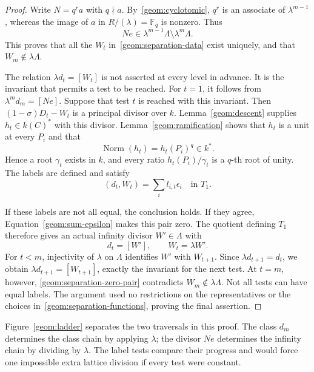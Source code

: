 \begin{proof}
Write $N=q^r a$ with $q\nmid a$.  By~\eqref{geom:cyclotomic},
$q^r$ is an associate of $\lambda^{m-1}$, whereas the image of $a$ in
$R/(\lambda)=\mathbb F_q$ is nonzero.  Thus
\begin{equation}
       Ne\in\lambda^{m-1}\Lambda\setminus\lambda^m\Lambda.
\label{geom:lattice-obstruction}
\end{equation}
This proves that all the $W_t$ in~\eqref{geom:separation-data} exist
uniquely, and that $W_m\notin\lambda\Lambda$.

The relation $\lambda d_t=[W_t]$ is not asserted at every level in
advance.  It is the invariant that permits a test to be reached.
For $t=1$, it follows from $\lambda^m d_m=[Ne]$.
Suppose that test $t$ is reached with this invariant.
Then $(1-\sigma)D_t-W_t$ is a principal divisor over $k$.
Lemma~\ref{geom:descent} supplies $h_t\in k(C)^*$ with this divisor.
Lemma~\ref{geom:ramification} shows that $h_t$ is a unit at every $P_i$
and that
\[
                   \operatorname{Norm}(h_t)=h_t(P_i)^q\in k^*.
\]
Hence a root $\gamma_t$ exists in $k$, and every ratio
$h_t(P_i)/\gamma_t$ is a $q$-th root of unity.  The labels are defined
and satisfy
\[
                       (d_t,W_t)=\sum_i l_{i,t}\epsilon_i
                       \quad\text{in }T_1.
\]

If these labels are not all equal, the conclusion holds.
If they agree, Equation~\eqref{geom:sum-epsilon} makes this pair zero.
The quotient defining $T_1$ therefore gives an actual infinity divisor
$W'\in\Lambda$ with
\begin{equation}
                         d_t=[W'],\qquad W_t=\lambda W'.
\label{geom:separation-zero-pair}
\end{equation}
For $t<m$, injectivity of $\lambda$ on $\Lambda$ identifies $W'$ with
$W_{t+1}$.  Since $\lambda d_{t+1}=d_t$, we obtain
$\lambda d_{t+1}=[W_{t+1}]$, exactly the invariant for the next test.
At $t=m$, however, \eqref{geom:separation-zero-pair} contradicts
$W_m\notin\lambda\Lambda$.  Not all tests can have equal labels.
The argument used no restrictions on the representatives or the choices
in~\eqref{geom:separation-functions}, proving the final assertion.
\end{proof}

Figure~\ref{geom:ladder} separates the two traversals in this proof.
The class $d_m$ determines the class chain by applying $\lambda$; the
divisor $Ne$ determines the infinity chain by dividing by $\lambda$.
The label tests compare their progress and would force one impossible
extra lattice division if every test were constant.


